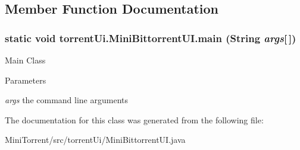 \subsection{Member Function Documentation}
\hypertarget{classtorrent_ui_1_1_mini_bittorrent_u_i_a7f4efe8c94bdb310a46b4a858c101ec9}{
\subsubsection[{main}]{\setlength{\rightskip}{0pt plus 5cm}static void torrentUi.MiniBittorrentUI.main (String {\em args}\mbox{[}$\,$\mbox{]})}}
\label{classtorrent_ui_1_1_mini_bittorrent_u_i_a7f4efe8c94bdb310a46b4a858c101ec9}
Main Class 
\begin{DoxyParams}{Parameters}
\item[{\em args}]the command line arguments \end{DoxyParams}


The documentation for this class was generated from the following file:\begin{DoxyCompactItemize}
\item 
MiniTorrent/src/torrentUi/MiniBittorrentUI.java\end{DoxyCompactItemize}
